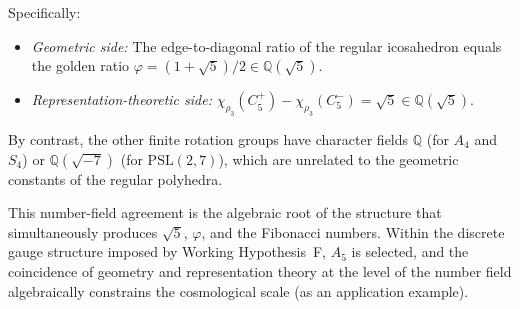 \documentclass[sn-mathphys-num,Numbered]{sn-jnl}
\theoremstyle{thmstyleone}
\theoremstyle{thmstylethree}
\theoremstyle{thmstyletwo}
\newcommand{\Qsqrt}{\mathbb{Q}(\sqrt{5})}
\begin{document}
Specifically:
\begin{itemize}
  \item \textit{Geometric side:} The edge-to-diagonal ratio of the
    regular icosahedron equals the golden ratio
    $\varphi = (1+\sqrt{5})/2 \in \Qsqrt$.
  \item \textit{Representation-theoretic side:}
    $\chi_{\rho_3}(C_5^+) - \chi_{\rho_3}(C_5^-) = \sqrt{5} \in \Qsqrt$.
\end{itemize}
By contrast, the other finite rotation groups have character fields
$\mathbb{Q}$ (for $A_4$ and $S_4$) or $\mathbb{Q}(\sqrt{-7})$ (for
$\mathrm{PSL}(2,7)$), which are unrelated to the geometric constants of
the regular polyhedra.

This number-field agreement is the algebraic root of the structure that
simultaneously produces $\sqrt{5}$, $\varphi$, and the Fibonacci
numbers. Within the discrete gauge structure imposed by Working
Hypothesis~F, $A_5$ is selected, and the coincidence of geometry and
representation theory at the level of the number field algebraically
constrains the cosmological scale (as an application example).
\end{document}
